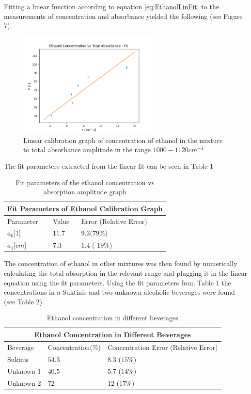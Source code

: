 \documentclass[reprint,amsmath,amssymb,aps, prl]{revtex4-2}
\begin{document}
Fitting a linear function according to equation \ref{eq:EthanolLinFit} to the measurements of concentration and absorbance yielded the following (see Figure 7).
    \begin{figure}[h]
    \includegraphics[width=7cm]{Images/linear_fittingethanol}
    \caption{Linear calibration graph of concentration of ethanol in the mixture to total absorbance amplitude in the range $1000-1120 cm^{-1}$}
    \label{fig:EthanolCalibration}
    \centering
\end{figure}
The fit parameters extracted from the linear fit can be seen in Table 1
\begin{table}[h]
\begin{tabular}{ |p{2cm}||p{2cm}|p{2cm}|  }
 \hline
 \multicolumn{3}{|c|}{Fit Parameters of Ethanol Calibration Graph} \\ \hline
 Parameter& Value &Error (Relative Error)\\ \hline
 $a_{0}$[$1$]    &$11.7$    &$9.3$($79\%$) \\
 $a_{1}$[$cm$] &$7.3$    & $1.4$ ( $19\%$)  \\ \hline
\end{tabular}
\caption{\label{ethanol table}Fit parameters of the ethanol concentration vs absorption amplitude graph}
\end{table}
The concentration of ethanol in other mixtures was then found by numerically calculating the total absorption in the relevant range and plugging it in the linear equation using the fit parameters. Using the fit parameters from Table 1 the concentrations in a Suktinis and two unknown alcoholic beverages were found (see Table 2).

\begin{table}[h]
\begin{tabular}{ |p{2.8cm}|p{2.8cm}|p{2.8cm}|  }
 \hline
 \multicolumn{3}{|c|}{Ethanol Concentration in Different Beverages} \\
 \hline
 Beverage& Concentration(\%) &Concentration Error (Relative Error) \\ \hline
 Sukinis    &$54.3$   &$8.3$ ($15\%$) \\
 Unknown 1  &$40.5$   &$5.7$ ($14\%$) \\
 Unknown 2  &$72$     & $12$ ($17\%$) \\ \hline
\end{tabular}
\caption{\label{beverages table}Ethanol concentration in different beverages}
\end{table}
\end{document}
